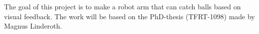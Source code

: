 The goal of this project is to make a robot arm that can catch balls based on visual feedback. The work will be based on the PhD-thesis (TFRT-1098) made by Magnus Linderoth.
